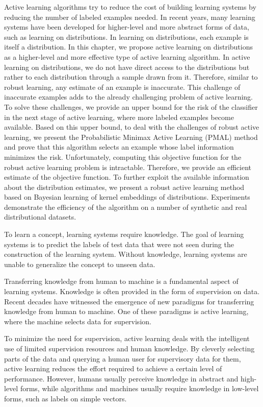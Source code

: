 \documentclass[12pt]{article}
\begin{document}
	Active learning algorithms try to reduce the cost of building learning systems by reducing the number of labeled examples needed. In recent years, many learning systems have been developed for higher-level and more abstract forms of data, such as learning on distributions. In learning on distributions, each example is itself a distribution. In this chapter, we propose active learning on distributions as a higher-level and more effective type of active learning algorithm. In active learning on distributions, we do not have direct access to the distributions but rather to each distribution through a sample drawn from it. Therefore, similar to robust learning, any estimate of an example is inaccurate. This challenge of inaccurate examples adds to the already challenging problem of active learning. To solve these challenges, we provide an upper bound for the risk of the classifier in the next stage of active learning, where more labeled examples become available. Based on this upper bound, to deal with the challenges of robust active learning, we present the Probabilistic Minimax Active Learning (PMAL) method and prove that this algorithm selects an example whose label information minimizes the risk. Unfortunately, computing this objective function for the robust active learning problem is intractable. Therefore, we provide an efficient estimate of the objective function. To further exploit the available information about the distribution estimates, we present a robust active learning method based on Bayesian learning of kernel embeddings of distributions. Experiments demonstrate the efficiency of the algorithm on a number of synthetic and real distributional datasets.
	
	To learn a concept, learning systems require knowledge. The goal of learning systems is to predict the labels of test data that were not seen during the construction of the learning system. Without knowledge, learning systems are unable to generalize the concept to unseen data.
	
	Transferring knowledge from human to machine is a fundamental aspect of learning systems. Knowledge is often provided in the form of supervision on data. Recent decades have witnessed the emergence of new paradigms for transferring knowledge from human to machine. One of these paradigms is active learning, where the machine selects data for supervision.
	
	To minimize the need for supervision, active learning deals with the intelligent use of limited supervision resources and human knowledge. By cleverly selecting parts of the data and querying a human user for supervisory data for them, active learning reduces the effort required to achieve a certain level of performance. However, humans usually perceive knowledge in abstract and high-level forms, while algorithms and machines usually require knowledge in low-level forms, such as labels on simple vectors.
	
\end{document}
